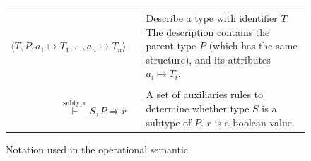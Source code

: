\begin{figure}
\begin{mdframed}[innermargin=0.3cm, outermargin=0.3cm]
{\begin{tabular}{rcl}
& & \\
$\langle T, P, a_1 \mapsto T_1, \dots, a_n \mapsto T_n \rangle$ & & \parbox[t]{8cm}{Describe a type with identifier $T$. The description contains the parent type $P$ (which has the same structure), and its attributes $a_i \mapsto T_i$. } \\
& & \\ 
$\overset{\operatorname{subtype}}{\vdash} S, P \Rightarrow r$ & & \parbox[t]{8cm}{A set of auxiliaries rules to determine whether type $S$ is a subtype of $P$. $r$ is a boolean value.} 
\end{tabular} 

}

\end{mdframed}
\caption{Notation used in the operational semantic}\label{fig:notation-for-operational-semantic}
\end{figure}

\renewcommand{\inference}[3][]{%
  \begin{array}[b]{@{}c@{}c@{}}
    \smash{\raisebox{-.5\normalbaselineskip}{{\scriptsize #1}}} & 
      \begin{array}[b]{l}
        #2
      \end{array} \\
      \cline{2-2}
    & \begin{array}[t]{c}
        #3
      \end{array}
  \end{array}
}

\mathlig{->}{\mapsto}
\mathlig{|-}{\vdash}
\mathlig{=>}{\Rightarrow}

\mathligson

